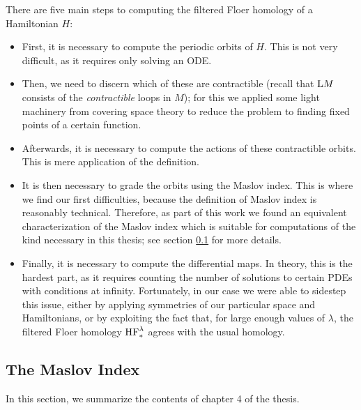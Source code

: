 There are five main steps to computing the filtered Floer homology of a Hamiltonian $H$:
\begin{itemize}
\item First, it is necessary to compute the periodic orbits of $H$. This is not very difficult, as it requires only solving an ODE.

\item Then, we need to discern which of these are contractible (recall that $\mathrm{L} M$ consists of the \emph{contractible} loops in $M$); for this we applied some light machinery from covering space theory to reduce the problem to finding fixed points of a certain function.

\item Afterwards, it is necessary to compute the actions of these contractible orbits. This is mere application of the definition.

\item It is then necessary to grade the orbits using the Maslov index. This is where we find our first difficulties, because the definition of Maslov index is reasonably technical. Therefore, as part of this work we found an equivalent characterization of the Maslov index which is suitable for computations of the kind necessary in this thesis; see section \ref{sec:maslov} for more details.

\item Finally, it is necessary to compute the differential maps. In theory, this is the hardest part, as it requires counting the number of solutions to certain PDEs with conditions at infinity. Fortunately, in our case we were able to sidestep this issue, either by applying symmetries of our particular space and Hamiltonians, or by exploiting the fact that, for large enough values of $\lambda$, the filtered Floer homology $\mathrm{HF}_*^\lambda$ agrees with the usual homology.
\end{itemize}

\subsection{The Maslov Index}\label{sec:maslov}

In this section, we summarize the contents of chapter 4 of the thesis.


